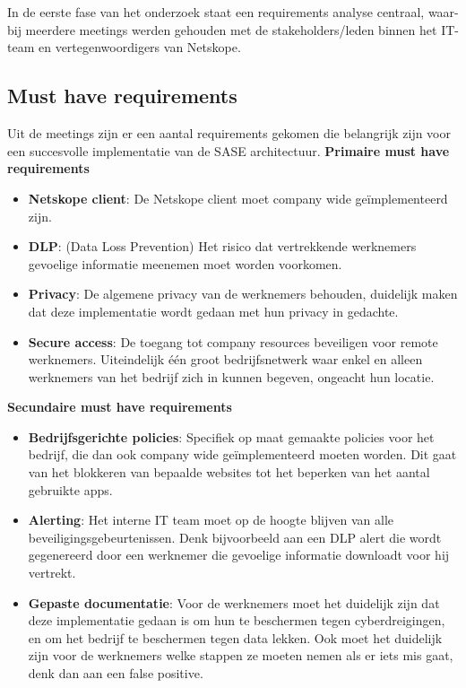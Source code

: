 
\chapter{}%
\label{ch:requirements analyse}

In de eerste fase van het onderzoek staat een requirements analyse centraal, waar-
bij meerdere meetings werden gehouden met de stakeholders/leden
binnen het IT-team en vertegenwoordigers van Netskope.

\section{Must have requirements}
Uit de meetings zijn er een aantal requirements gekomen die belangrijk zijn voor een succesvolle implementatie van de SASE architectuur.
\textbf{Primaire must have requirements}
\begin{itemize}
  \item \textbf{Netskope client}: De Netskope client moet company wide geïmplementeerd zijn. 
  \item \textbf{DLP}: (Data Loss Prevention) Het risico dat vertrekkende werknemers gevoelige informatie meenemen moet worden voorkomen.
  \item \textbf{Privacy}: De algemene privacy van de werknemers behouden, duidelijk maken dat deze implementatie wordt gedaan met hun privacy in gedachte.
  \item \textbf{Secure access}: De toegang tot company resources beveiligen voor remote werknemers. Uiteindelijk één groot bedrijfsnetwerk waar enkel en alleen werknemers van het bedrijf zich in kunnen begeven, ongeacht hun locatie.
\end{itemize}

\textbf{Secundaire must have requirements}
\begin{itemize}
  \item \textbf{Bedrijfsgerichte policies}: Specifiek op maat gemaakte policies voor het bedrijf, die dan ook company wide geïmplementeerd moeten worden. Dit gaat van het blokkeren van bepaalde websites tot het beperken van het aantal gebruikte apps.
  \item \textbf{Alerting}: Het interne IT team moet op de hoogte blijven van alle beveiligingsgebeurtenissen. Denk bijvoorbeeld aan een DLP alert die wordt gegenereerd door een werknemer die gevoelige informatie downloadt voor hij vertrekt.
  \item \textbf{Gepaste documentatie}: Voor de werknemers moet het duidelijk zijn dat deze implementatie gedaan is om hun te beschermen tegen cyberdreigingen, en om het bedrijf te beschermen tegen data lekken. Ook moet het duidelijk zijn voor de werknemers welke stappen ze moeten nemen als er iets mis gaat, denk dan aan een false positive.
\end{itemize}

